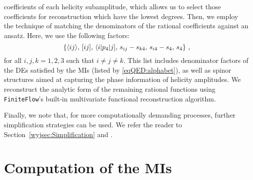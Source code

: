 \documentclass[main.tex]{subfiles}
\begin{document}
coefficients of each helicity subamplitude, which allows us to select those coefficients for reconstruction which have the lowest degrees. Then, we employ the technique of matching the denominators of the rational coefficients against an ansatz. Here, we use the following factors:
\begin{equation}
	\left\{\langle ij \rangle , \, [ ij ] , \, \langle i|p_4|j] , \, s_{ij} - s_{k4} , \, s_{i4} - s_4 , \, s_4 \right\} \,,
\end{equation}
for all $i, j, k = 1, 2, 3$ such that $i\neq j \neq k$. This list includes denominator factors of the DEs satisfied by the MIs (listed by \cref{eqQED:alphabet}), 
as well as spinor structures aimed at capturing the phase information of helicity amplitudes.
We reconstruct the analytic form of the remaining rational functions using \texttt{FiniteFlow}'s built-in multivariate functional reconstruction algorithm.

Finally, we note that, for more computationally demanding processes, further simplification strategies can be used. We refer the reader to Section~\ref{wyjsec:Simplification} and .

\section{Computation of the \aclp{MI}}
\label{secQED:spec-fns}
\end{document}
